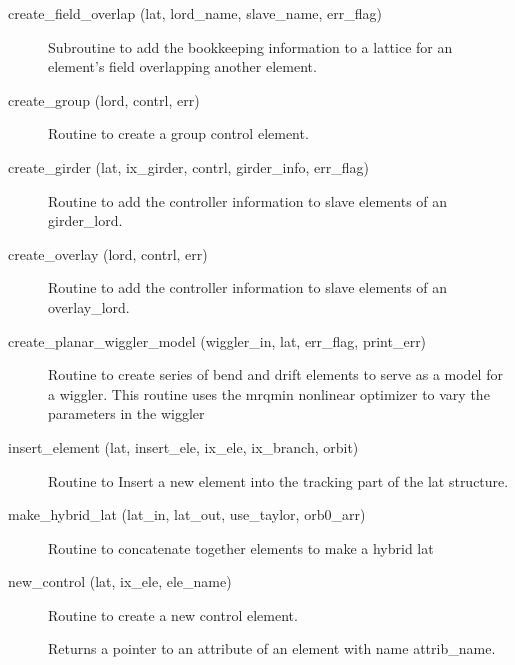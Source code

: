 \begin{description}
\label{r:create.field.overlap}
\item[create_field_overlap (lat, lord_name, slave_name, err_flag)] \Newline 
Subroutine to add the bookkeeping information to a lattice for an element's field
overlapping another element.

\label{r:create.group}
\item[create_group (lord, contrl, err)] \Newline
Routine to create a group control element. 

\label{r:create.girder}
\item[create_girder (lat, ix_girder, contrl, girder_info, err_flag)] \Newline 
     Routine to add the controller information to slave elements of
     an girder_lord.

\label{r:create.overlay}
\item[create_overlay (lord, contrl, err)] \Newline
Routine to add the controller information to slave elements of an 
overlay_lord. 

\label{r:create.planar.wiggler.model}
\item[create_planar_wiggler_model (wiggler_in, lat, err_flag, print_err)] \Newline 
Routine to create series of bend and drift elements to serve as a model for a wiggler.
This routine uses the mrqmin nonlinear optimizer to vary the parameters in the wiggler 

\label{r:insert.element}
\item[insert_element (lat, insert_ele, ix_ele, ix_branch, orbit)] \Newline
Routine to Insert a new element into the tracking part of the 
lat structure. 

\label{r:make.hybrid.lat}
\item[make_hybrid_lat (lat_in, lat_out, use_taylor, orb0_arr)] \Newline
Routine to concatenate together elements to make a hybrid lat 

\label{r:new.control}
\item[new_control (lat, ix_ele, ele_name)] \Newline
Routine to create a new control element. 

\label{r:pointer.to.attribute}
\item[\protect\parbox{6in}{
  pointer_to_attribute (ele, attrib_name, do_allocation, a_ptr, err_flag, \\
  \hspace*{1in} err_print_flag, ix_attrib, do_unlink) }] \Newline
Returns a pointer to an attribute of an element with name attrib_name. 


\end{description}
